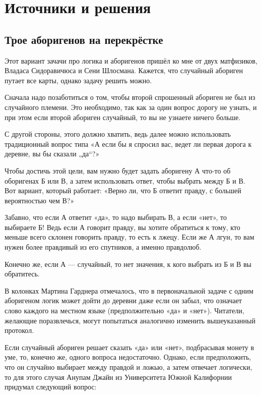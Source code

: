 \section*{Источники и решения}

\subsection*{Трое аборигенов на перекрёстке}

Этот вариант зачачи про логика и аборигенов пришёл ко мне от двух матфизиков, Владаса Сидоравичюса и Сени Шлосмана.
Кажется, что случайный абориген путает все карты, однако задачу решить можно.

Сначала надо позаботиться о том, чтобы второй спрошенный абориген не был из случайного племени.
Это необходимо, так как за один вопрос дорогу не узнать, и при этом если второй абориген случайный, то вы не узнаете ничего больше.

С другой стороны, этого должно хватить, ведь далее можно использовать традиционный вопрос типа «А если бы я спросил вас, ведет ли первая дорога к деревне, вы бы сказали „да“?»

Чтобы достичь этой цели, вам нужно будет задать аборигену А что-то об оборигенах Б или В, а затем использовать ответ, чтобы выбрать между Б и В.
Вот вариант, который работает: «Верно ли, что Б ответит правду, с большей вероятностью чем В?»

Забавно, что если А ответит «да», то надо выбирать В, а если «нет», то выбираете Б!
Ведь если А говорит правду, вы хотите обратиться к тому, кто меньше всего склонен говорить правду, то есть к лжецу.
Если же А лгун, то вам нужен более правдивый из его спутников, а именно правдолюб.

Конечно же, если А --- случайный, то нет значения, к кого выбрать из Б и В вы обратитесь.

В колонках Мартина Гарднера отмечалось, что в первоначальной задаче с одним аборигеном логик может дойти до деревни даже если он забыл, что означает слово каждого на местном языке (предполжительно «да» и «нет»).
Читатели, желающие поразвлечься, могут попытаться аналогично изменить вышеуказанный протокол.

Если случайный абориген решает сказать «да» или «нет», подбрасывая монету в уме, то, конечно же, одного вопроса недостаточно.
Однако, если предположить, что он случайно выбирает между правдой и ложью, а затем отвечает логически,
то для этого случая Анупам Джайн из Университета Южной Калифорнии придумал следующий вопрос:


